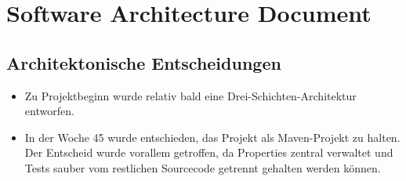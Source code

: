 \section{Software Architecture Document}
\label{sec:Software Architecture Document}
% 
% 
% 
% 
% 
\subsection{Architektonische Entscheidungen}
\begin{itemize}
  \item Zu Projektbeginn wurde relativ bald eine Drei-Schichten-Architektur entworfen.
  \item In der Woche 45 wurde entschieden, das Projekt als Maven-Projekt zu halten. Der Entscheid wurde vorallem getroffen, da Properties zentral verwaltet und Tests sauber vom restlichen Sourcecode getrennt gehalten werden k\"onnen.
\end{itemize}
% 
